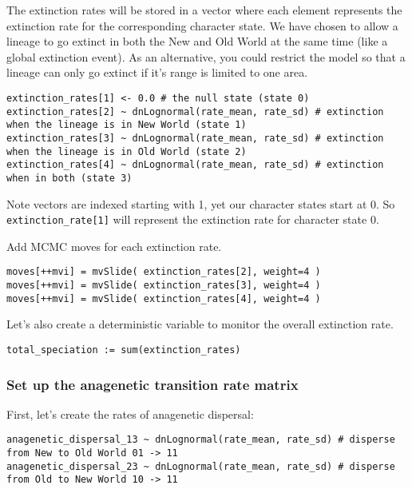 The extinction rates will be stored in a vector where each element represents
the extinction rate for the corresponding character state. 
We have chosen to allow a lineage to go extinct in both the New and Old World 
at the same time (like a global extinction event). As an alternative, you could 
restrict the model so that a lineage can only go extinct if it's range is limited 
to one area.
{\tt \begin{snugshade*}
\begin{lstlisting}
extinction_rates[1] <- 0.0 # the null state (state 0)
extinction_rates[2] ~ dnLognormal(rate_mean, rate_sd) # extinction when the lineage is in New World (state 1)
extinction_rates[3] ~ dnLognormal(rate_mean, rate_sd) # extinction when the lineage is in Old World (state 2)
extinction_rates[4] ~ dnLognormal(rate_mean, rate_sd) # extinction when in both (state 3)
\end{lstlisting}
\end{snugshade*}}
Note \Rev vectors are indexed starting with 1, yet our character states start
at 0. So \texttt{extinction\_rate[1]} will represent the extinction rate for character
state 0.

Add MCMC moves for each extinction rate.
{\tt \begin{snugshade*}
\begin{lstlisting}
moves[++mvi] = mvSlide( extinction_rates[2], weight=4 )
moves[++mvi] = mvSlide( extinction_rates[3], weight=4 )
moves[++mvi] = mvSlide( extinction_rates[4], weight=4 )
\end{lstlisting}
\end{snugshade*}}

Let's also create a deterministic variable to monitor the overall extinction rate.
{\tt \begin{snugshade*}
\begin{lstlisting}
total_speciation := sum(extinction_rates)
\end{lstlisting}
\end{snugshade*}}

\subsubsection{Set up the anagenetic transition rate matrix}

First, let's create the rates of anagenetic dispersal:
{\tt \begin{snugshade*}
\begin{lstlisting}
anagenetic_dispersal_13 ~ dnLognormal(rate_mean, rate_sd) # disperse from New to Old World 01 -> 11
anagenetic_dispersal_23 ~ dnLognormal(rate_mean, rate_sd) # disperse from Old to New World 10 -> 11
\end{lstlisting}
\end{snugshade*}}

